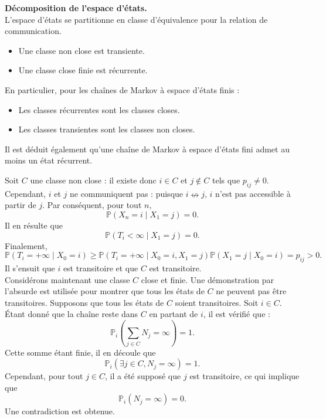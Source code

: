 \begin{sloppypar}
\begin{tcolorbox}[colback=green!5!white,colframe=green!75!black,title=Proposition]
    \textbf{Décomposition de l’espace d’états.}\\

    L’espace d’états se partitionne en classe d’équivalence pour la relation de communication.
    
    \begin{itemize}
        \item Une classe non close est transiente.
        \item Une classe close finie est récurrente.
    \end{itemize}
    
    En particulier, pour les chaînes de Markov à espace d’états finis :
    \begin{itemize}
        \item Les classes récurrentes sont les classes closes.
        \item Les classes transientes sont les classes non closes.
    \end{itemize}
    
    Il est déduit également qu’une chaîne de Markov à espace d’états fini admet au moins un état récurrent.
\end{tcolorbox}    

Soit $C$ une classe non close : il existe donc $i \in C$ et $j \notin C$ tels que $p_{ij} \neq 0$. 
Cependant, $i$ et $j$ ne communiquent pas : puisque $i \nleftrightarrow j$, $i$ n’est pas accessible à partir de $j$. 
Par conséquent, pour tout $n$, 
\[
\mathbb{P}(X_n = i \mid X_1 = j) = 0.
\]
Il en résulte que 
\[
\mathbb{P}(T_i < \infty \mid X_1 = j) = 0.
\]
Finalement, 
\[
\mathbb{P}(T_i = +\infty \mid X_0 = i) \geq \mathbb{P}(T_i = +\infty \mid X_0 = i, X_1 = j) \mathbb{P}(X_1 = j \mid X_0 = i) = p_{ij} > 0.
\]
Il s'ensuit que $i$ est transitoire et que $C$ est transitoire.\\

Considérons maintenant une classe $C$ close et finie. Une démonstration par l'absurde est utilisée pour montrer que tous les états de $C$ ne peuvent pas être transitoires. Supposons que tous les états de $C$ soient transitoires. Soit $i \in C$. Étant donné que la chaîne reste dans $C$ en partant de $i$, il est vérifié que :
\[
\mathbb{P}_i\left(\sum_{j \in C} N_j = \infty\right) = 1.
\]
Cette somme étant finie, il en découle que 
\[
\mathbb{P}_i\left(\exists j \in C, N_j = \infty\right) = 1.
\]
Cependant, pour tout $j \in C$, il a été supposé que $j$ est transitoire, ce qui implique que 
\[
\mathbb{P}_i(N_j = \infty) = 0.
\]
Une contradiction est obtenue.\\


\end{sloppypar}

